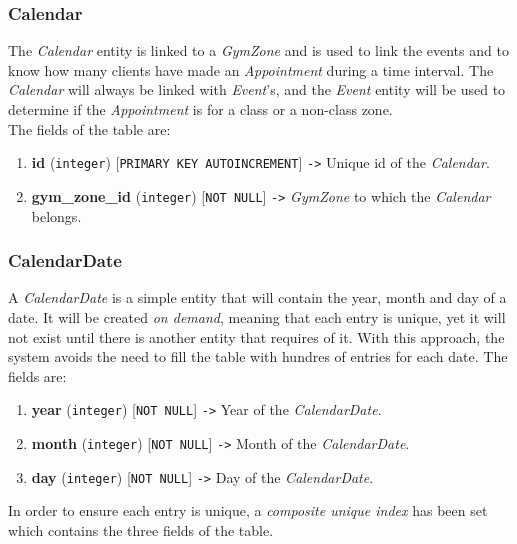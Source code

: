 \documentclass[a4paper, 12pt, oneside]{book}
\begin{document}
\subsubsection{Calendar}
The \emph{Calendar} entity is linked to a \emph{GymZone} and is used to link the events and to know how many clients have made an \emph{Appointment} during a time interval. The \emph{Calendar} will always be linked with \emph{Event}'s, and the \emph{Event} entity will be used to determine if the \emph{Appointment} is for a class or a non-class zone.
\\[8pt]
The fields of the table are:
\begin{enumerate}[label = -]
	\item \textbf{id} (\texttt{integer}) [\texttt{PRIMARY KEY AUTOINCREMENT}] \texttt{->} Unique id of the \emph{Calendar}.
	\item \textbf{gym\_zone\_id} (\texttt{integer}) [\texttt{NOT NULL}] \texttt{->} \emph{GymZone} to which the \emph{Calendar} belongs.
\end{enumerate}
\subsubsection{CalendarDate}
A \emph{CalendarDate} is a simple entity that will contain the year, month and day of a date. It will be created \emph{on demand}, meaning that each entry is unique, yet it will not exist until there is another entity that requires of it. With this approach, the system avoids the need to fill the table with hundres of entries for each date. The fields are:
\begin{enumerate}[label = -]
	\item \textbf{year} (\texttt{integer}) [\texttt{NOT NULL}] \texttt{->} Year of the \emph{CalendarDate}.
	\item \textbf{month} (\texttt{integer}) [\texttt{NOT NULL}] \texttt{->} Month of the \emph{CalendarDate}.
	\item \textbf{day} (\texttt{integer}) [\texttt{NOT NULL}] \texttt{->} Day of the \emph{CalendarDate}.
\end{enumerate}
In order to ensure each entry is unique, a \emph{composite unique index} has been set which contains the three fields of the table.
\end{document}
